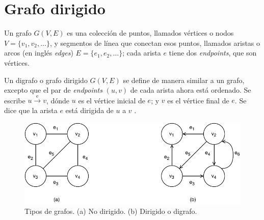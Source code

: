 \section{Grafo dirigido}\label{DirectedGraph}
Un grafo \( G(V,E) \) es una colección de puntos, llamados vértices o nodos \( V = \{ v_1, v_2, \dots \} \), y segmentos de línea que conectan esos puntos, llamados aristas o arcos (en inglés \textit{edges}) \( E = \{ e_1, e_2, \dots \} \); cada arista \( e \) tiene dos \textit{\gls{endpoints}}, que son vértices.

Un digrafo o grafo dirigido \( G(V,E) \) se define de manera similar a un grafo, excepto que el par de \textit{\gls{endpoints}} \( (u, v) \) de cada arista ahora está ordenado. Se escribe \( u \xrightarrow{\text{e}} v \), dónde \( u \) es el vértice inicial de \( e \); y \( v \) es el vértice final de \( e \). Se dice que la arista \( e \) está dirigida de \( u \) a \( v \) \cite{book:even2011graph}.

\begin{figure}[H]
	\centering
	\includegraphics[width=0.9\linewidth]{doc/DirectedGraph/img/directed-undirected-graph}
	\caption{Tipos de grafos. (a) No dirigido. (b) Dirigido o digrafo. }
	\label{fig:directed-undirected-graph}
\end{figure}